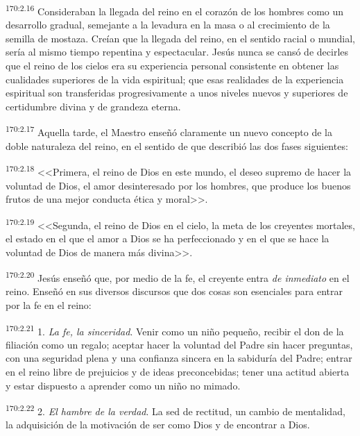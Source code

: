 \par 
\textsuperscript{170:2.16} Consideraban la llegada del reino en el corazón de los hombres como un desarrollo gradual, semejante a la levadura en la masa o al crecimiento de la semilla de mostaza. Creían que la llegada del reino, en el sentido racial o mundial, sería al mismo tiempo repentina y espectacular. Jesús nunca se cansó de decirles que el reino de los cielos era su experiencia personal consistente en obtener las cualidades superiores de la vida espiritual; que esas realidades de la experiencia espiritual son transferidas progresivamente a unos niveles nuevos y superiores de certidumbre divina y de grandeza eterna.

\par 
\textsuperscript{170:2.17} Aquella tarde, el Maestro enseñó claramente un nuevo concepto de la doble naturaleza del reino, en el sentido de que describió las dos fases siguientes:

\par 
\textsuperscript{170:2.18} <<Primera, el reino de Dios en este mundo, el deseo supremo de hacer la voluntad de Dios, el amor desinteresado por los hombres, que produce los buenos frutos de una mejor conducta ética y moral>>.

\par 
\textsuperscript{170:2.19} <<Segunda, el reino de Dios en el cielo, la meta de los creyentes mortales, el estado en el que el amor a Dios se ha perfeccionado y en el que se hace la voluntad de Dios de manera más divina>>.

\par 
\textsuperscript{170:2.20} Jesús enseñó que, por medio de la fe, el creyente entra \textit{de inmediato} en el reino. Enseñó en sus diversos discursos que dos cosas son esenciales para entrar por la fe en el reino:

\par 
\textsuperscript{170:2.21} 1. \textit{La fe, la sinceridad}. Venir como un niño pequeño, recibir el don de la filiación como un regalo; aceptar hacer la voluntad del Padre sin hacer preguntas, con una seguridad plena y una confianza sincera en la sabiduría del Padre; entrar en el reino libre de prejuicios y de ideas preconcebidas; tener una actitud abierta y estar dispuesto a aprender como un niño no mimado.

\par 
\textsuperscript{170:2.22} 2. \textit{El hambre de la verdad}. La sed de rectitud, un cambio de mentalidad, la adquisición de la motivación de ser como Dios y de encontrar a Dios.

